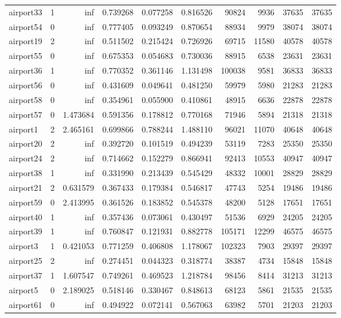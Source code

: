 \begin{longtable}{|l|r|r|r|r|r|r|r|r|r|}
airport33 & 1 & inf & 0.739268 & 0.077258 & 0.816526 & 90824 & 9936 & 37635 & 37635 \\
airport54 & 0 & inf & 0.777405 & 0.093249 & 0.870654 & 88934 & 9979 & 38074 & 38074 \\
airport19 & 2 & inf & 0.511502 & 0.215424 & 0.726926 & 69715 & 11580 & 40578 & 40578 \\
airport55 & 0 & inf & 0.675353 & 0.054683 & 0.730036 & 88915 & 6538 & 23631 & 23631 \\
airport36 & 1 & inf & 0.770352 & 0.361146 & 1.131498 & 100038 & 9581 & 36833 & 36833 \\
airport56 & 0 & inf & 0.431609 & 0.049641 & 0.481250 & 59979 & 5980 & 21283 & 21283 \\
airport58 & 0 & inf & 0.354961 & 0.055900 & 0.410861 & 48915 & 6636 & 22878 & 22878 \\
airport57 & 0 & 1.473684 & 0.591356 & 0.178812 & 0.770168 & 71946 & 5894 & 21318 & 21318 \\
airport1 & 2 & 2.465161 & 0.699866 & 0.788244 & 1.488110 & 96021 & 11070 & 40648 & 40648 \\
airport20 & 2 & inf & 0.392720 & 0.101519 & 0.494239 & 53119 & 7283 & 25350 & 25350 \\
airport24 & 2 & inf & 0.714662 & 0.152279 & 0.866941 & 92413 & 10553 & 40947 & 40947 \\
airport38 & 1 & inf & 0.331990 & 0.213439 & 0.545429 & 48332 & 10001 & 28829 & 28829 \\
airport21 & 2 & 0.631579 & 0.367433 & 0.179384 & 0.546817 & 47743 & 5254 & 19486 & 19486 \\
airport59 & 0 & 2.413995 & 0.361526 & 0.183852 & 0.545378 & 48200 & 5128 & 17651 & 17651 \\
airport40 & 1 & inf & 0.357436 & 0.073061 & 0.430497 & 51536 & 6929 & 24205 & 24205 \\
airport39 & 1 & inf & 0.760847 & 0.121931 & 0.882778 & 105171 & 12299 & 46575 & 46575 \\
airport3 & 1 & 0.421053 & 0.771259 & 0.406808 & 1.178067 & 102323 & 7903 & 29397 & 29397 \\
airport25 & 2 & inf & 0.274451 & 0.044323 & 0.318774 & 38387 & 4734 & 15848 & 15848 \\
airport37 & 1 & 1.607547 & 0.749261 & 0.469523 & 1.218784 & 98456 & 8414 & 31213 & 31213 \\
airport5 & 0 & 2.189025 & 0.518146 & 0.330467 & 0.848613 & 68123 & 5861 & 21535 & 21535 \\
airport61 & 0 & inf & 0.494922 & 0.072141 & 0.567063 & 63982 & 5701 & 21203 & 21203 \\

\end{longtable}

